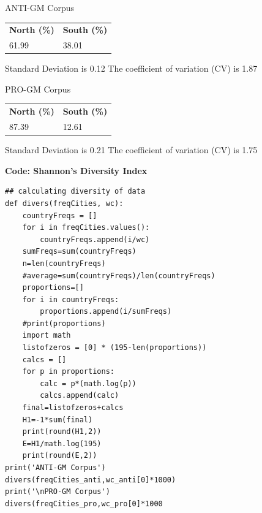 \begin{footnotesize}

ANTI-GM Corpus

\begin{table}[h]
\begin{footnotesize}
\begin{tabular}{ll}
\textbf{North (\%)} & \textbf{South (\%)} \\
61.99              & 38.01             
\end{tabular}
\end{footnotesize}
\end{table}

Standard Deviation is 0.12 \newline
The coefficient of variation (CV) is 1.87

PRO-GM Corpus

\begin{table}[h]
\begin{footnotesize}
\begin{tabular}{ll}
\textbf{North (\%)} & \textbf{South (\%)} \\
87.39            & 12.61             
\end{tabular}
\end{footnotesize}
\end{table}

Standard Deviation is 0.21 \newline
The coefficient of variation (CV) is 1.75

\end{footnotesize}

\textbf{Code: Shannon's Diversity Index}

\begin{lstlisting}
## calculating diversity of data
def divers(freqCities, wc):
    countryFreqs = []
    for i in freqCities.values():
        countryFreqs.append(i/wc)
    sumFreqs=sum(countryFreqs)
    n=len(countryFreqs)
    #average=sum(countryFreqs)/len(countryFreqs)
    proportions=[]
    for i in countryFreqs:
        proportions.append(i/sumFreqs)
    #print(proportions)
    import math
    listofzeros = [0] * (195-len(proportions))
    calcs = []
    for p in proportions:
        calc = p*(math.log(p))
        calcs.append(calc)
    final=listofzeros+calcs
    H1=-1*sum(final)
    print(round(H1,2))
    E=H1/math.log(195)
    print(round(E,2))
print('ANTI-GM Corpus') 
divers(freqCities_anti,wc_anti[0]*1000)
print('\nPRO-GM Corpus') 
divers(freqCities_pro,wc_pro[0]*1000
\end{lstlisting}

